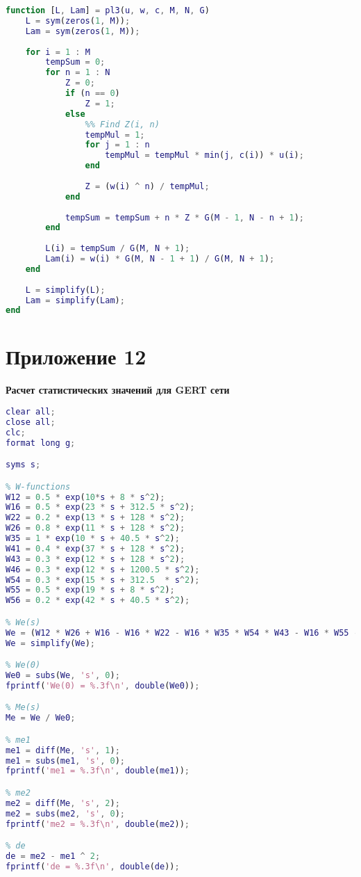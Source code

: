 \begin{lstlisting}[language={matlab}, caption={Расчет основных характеристик СМО}, label={lst:0}, basicstyle={\footnotesize\ttfamily}, breaklines={true}]
function [L, Lam] = pl3(u, w, c, M, N, G)
	L = sym(zeros(1, M));
	Lam = sym(zeros(1, M));
	
	for i = 1 : M
		tempSum = 0;
		for n = 1 : N
			Z = 0;
			if (n == 0)
				Z = 1;
			else
				%% Find Z(i, n)
				tempMul = 1;
				for j = 1 : n
					tempMul = tempMul * min(j, c(i)) * u(i);
				end
				
				Z = (w(i) ^ n) / tempMul;
			end
			
			tempSum = tempSum + n * Z * G(M - 1, N - n + 1);
		end
		
		L(i) = tempSum / G(M, N + 1);
		Lam(i) = w(i) * G(M, N - 1 + 1) / G(M, N + 1);
	end
	
	L = simplify(L);
	Lam = simplify(Lam);
end
\end{lstlisting}

\section*{Приложение 12} \label{p4:12}
\textbf{Расчет статистических значений для GERT сети}
\begin{lstlisting}[language={matlab}, caption={Расчет статистических значений для GERT сети}, label={lst:0}, basicstyle={\footnotesize\ttfamily}, breaklines={true}]
clear all;
close all; 
clc;
format long g;

syms s;

% W-functions
W12 = 0.5 * exp(10*s + 8 * s^2);
W16 = 0.5 * exp(23 * s + 312.5 * s^2);
W22 = 0.2 * exp(13 * s + 128 * s^2);
W26 = 0.8 * exp(11 * s + 128 * s^2);
W35 = 1 * exp(10 * s + 40.5 * s^2);
W41 = 0.4 * exp(37 * s + 128 * s^2);
W43 = 0.3 * exp(12 * s + 128 * s^2);
W46 = 0.3 * exp(12 * s + 1200.5 * s^2);
W54 = 0.3 * exp(15 * s + 312.5  * s^2);
W55 = 0.5 * exp(19 * s + 8 * s^2);
W56 = 0.2 * exp(42 * s + 40.5 * s^2);

% We(s)
We = (W12 * W26 + W16 - W16 * W22 - W16 * W35 * W54 * W43 - W16 * W55 - W12 * W26 * W55 - W12 * W26 * W35 * W54 * W43 + W16 * W22 * W35 * W54 * W43 + W16 * W22 * W55) / (1 - W35 * W54 * W43 - W22 - W55 + W22 * W55 + W22 * W35 * W54 * W43);
We = simplify(We);

% We(0)
We0 = subs(We, 's', 0);
fprintf('We(0) = %.3f\n', double(We0));

% Me(s)
Me = We / We0;

% me1
me1 = diff(Me, 's', 1);
me1 = subs(me1, 's', 0);
fprintf('me1 = %.3f\n', double(me1));

% me2
me2 = diff(Me, 's', 2);
me2 = subs(me2, 's', 0);
fprintf('me2 = %.3f\n', double(me2));

% de
de = me2 - me1 ^ 2;
fprintf('de = %.3f\n', double(de));

\end{lstlisting}

